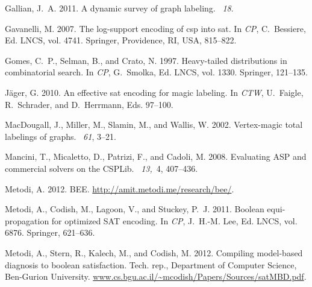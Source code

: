 \documentclass{tlp}
\newcommand{\bee}{\textsf{BEE}}
\begin{document}
\begin{thebibliography}{}
{\sc Gallian, J.~A.} 2011.
\newblock A dynamic survey of graph labeling.
~{\em 18}.

{\sc Gavanelli, M.} 2007.
\newblock The log-support encoding of csp into sat.
\newblock In {\em CP}, {C.~Bessiere}, Ed. LNCS, vol. 4741. Springer,
  Providence, RI, USA, 815--822.

{\sc Gomes, C.~P.}, {\sc Selman, B.}, {\sc and} {\sc Crato, N.} 1997.
\newblock Heavy-tailed distributions in combinatorial search.
\newblock In {\em CP}, {G.~Smolka}, Ed. LNCS, vol. 1330. Springer, 121--135.

{\sc J{\"a}ger, G.} 2010.
\newblock An effective sat encoding for magic labeling.
\newblock In {\em CTW}, {U.~Faigle}, {R.~Schrader}, {and} {D.~Herrmann}, Eds.
  97--100.

{\sc MacDougall, J.}, {\sc Miller, M.}, {\sc Slamin, M.}, {\sc and} {\sc
  Wallis, W.} 2002.
\newblock Vertex-magic total labelings of graphs.
~{\em 61}, 3--21.

{\sc Mancini, T.}, {\sc Micaletto, D.}, {\sc Patrizi, F.}, {\sc and} {\sc
  Cadoli, M.} 2008.
\newblock Evaluating {ASP} and commercial solvers on the {CSPLib}.
~{\em 13,\/}~4, 407--436.

{\sc Metodi, A.} 2012.
\newblock \bee.
\newblock \url{http://amit.metodi.me/research/bee/}.

{\sc Metodi, A.}, {\sc Codish, M.}, {\sc Lagoon, V.}, {\sc and} {\sc Stuckey,
  P.~J.} 2011.
\newblock Boolean equi-propagation for optimized {SAT} encoding.
\newblock In {\em CP}, {J.~H.-M. Lee}, Ed. LNCS, vol. 6876. Springer, 621--636.

{\sc Metodi, A.}, {\sc Stern, R.}, {\sc Kalech, M.}, {\sc and} {\sc Codish, M.}
  2012.
\newblock Compiling model-based diagnosis to boolean satisfaction.
\newblock Tech. rep., Department of Computer Science, Ben-Gurion University.
\newblock \url{www.cs.bgu.ac.il/~mcodish/Papers/Sources/satMBD.pdf}.


\end{thebibliography}
\end{document}

